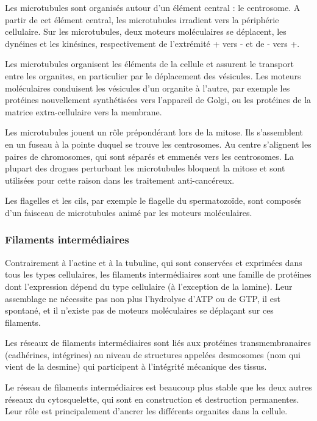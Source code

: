 Les microtubules sont organisés autour d'un élément central : le centrosome. A partir de cet élément central, les microtubules irradient vers la périphérie cellulaire. 
Sur les microtubules, deux moteurs moléculaires se déplacent, les dynéines et les kinésines, respectivement de l'extrémité + vers - et de - vers +.  

Les microtubules organisent les éléments de la cellule et assurent le transport entre les organites, en particulier par le déplacement des vésicules. Les moteurs moléculaires conduisent les vésicules d'un organite à l'autre, par exemple les protéines nouvellement synthétisées vers l'appareil de Golgi, ou les protéines de la matrice extra-cellulaire vers la membrane. 

Les microtubules jouent un rôle prépondérant lors de la mitose. Ils s'assemblent en un fuseau à la pointe duquel se trouve les centrosomes. Au centre s'alignent les paires de chromosomes, qui sont séparés et emmenés vers les centrosomes. La plupart des drogues perturbant les microtubules bloquent la mitose et sont utilisées pour cette raison dans les traitement anti-cancéreux. 

Les flagelles et les cils, par exemple le flagelle du spermatozoïde, sont composés d'un faisceau de microtubules animé par les moteurs moléculaires. 

\subsubsection{Filaments intermédiaires}

Contrairement à l'actine et à la tubuline, qui sont conservées et exprimées dans tous les types cellulaires, les filaments intermédiaires sont une famille de protéines dont l'expression dépend du type cellulaire (à l'exception de la lamine). 
Leur assemblage ne nécessite pas non plus l'hydrolyse d'ATP ou de GTP, il est spontané, et il n'existe pas de moteurs moléculaires se déplaçant sur ces filaments. 

Les réseaux de filaments intermédiaires sont liés aux protéines transmembranaires (cadhérines, intégrines) au niveau de structures appelées desmosomes (nom qui vient de la desmine) qui participent à l'intégrité mécanique des tissus. 

Le réseau de filaments intermédiaires est beaucoup plus stable que les deux autres réseaux du cytosquelette, qui sont en construction et destruction permanentes. Leur rôle est principalement d'ancrer les différents organites dans la cellule. 

